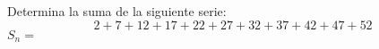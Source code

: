 
\question Determina la suma de la siguiente serie:
\[
2 + 7 + 12 + 17 + 22 + 27 + 32 + 37 + 42 + 47 + 52
\]
$S_n=$\fillin[297]


